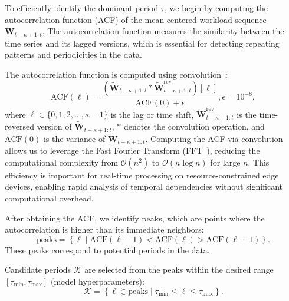 \documentclass{ieeetmlcn}
\begin{document}
{\color{blue}
To efficiently identify the dominant period $\tau$, we begin by computing the autocorrelation function (ACF) of the mean-centered workload sequence $\tilde{\mathbf{W}}_{t-\kappa+1:t}$. The autocorrelation function measures the similarity between the time series and its lagged versions, which is essential for detecting repeating patterns and periodicities in the data.

The autocorrelation function is computed using convolution~\cite{zhang2020autocorrelation}:
\begin{equation}
\label{eq:acf}
\text{ACF}(\ell) = \frac{(\tilde{\mathbf{W}}_{t-\kappa+1:t} \ast \tilde{\mathbf{W}}^{\text{rev}}_{t-\kappa+1:t})[\ell]}{\text{ACF}(0) + \epsilon},   \epsilon = 10^{-8},
\end{equation}
where $\ell \in \{0, 1, 2, \ldots, \kappa-1\}$ is the lag or time shift, $\tilde{\mathbf{W}}^{\text{rev}}_{t-\kappa+1:t}$ is the time-reversed version of $\tilde{\mathbf{W}}_{t-\kappa+1:t}$, $\ast$ denotes the convolution operation, and $\text{ACF}(0)$ is the variance of $\tilde{\mathbf{W}}_{t-\kappa+1:t}$. Computing the ACF via convolution allows us to leverage the Fast Fourier Transform (FFT~\cite{nussbaumer1982fast}), reducing the computational complexity from $\mathcal{O}(n^2)$ to $\mathcal{O}(n \log n)$ for large $n$. This efficiency is important for real-time processing on resource-constrained edge devices, enabling rapid analysis of temporal dependencies without significant computational overhead.

After obtaining the ACF, we identify peaks, which are points where the autocorrelation is higher than its immediate neighbors:
\begin{equation}
\label{eq:peak_detection}
\text{peaks} = \left\{ \ell  \middle|  \text{ACF}(\ell-1) < \text{ACF}(\ell) > \text{ACF}(\ell+1) \right\}.
\end{equation}
These peaks correspond to potential periods in the data.
}

Candidate periods $\mathcal{K}$ are selected from the peaks within the desired range $[\tau_{\min}, \tau_{\max}]$ (model hyperparameters):
\begin{equation}
\label{eq:candidate_periods}
\mathcal{K} = \left\{ \ell \in \text{peaks}  \middle|  \tau_{\min} \leq \ell \leq \tau_{\max} \right\}.
\end{equation}
\end{document}
